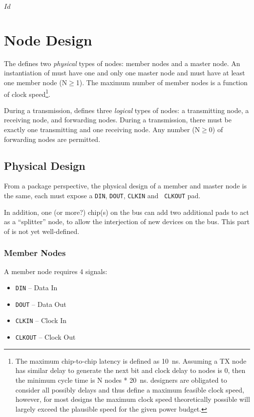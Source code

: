\svnInfo $Id$

\section{Node Design}
\label{sec:node}
The \bus defines two {\em physical} types of nodes: member nodes and a master
node. An instantiation of \bus must have one and only one master node and
must have at least one member node (N$\geq$1). The maximum number of member
nodes is a function of clock speed\footnote{
  The maximum chip-to-chip latency is defined as 10~ns. Assuming a TX node has
similar delay to generate the next bit and clock delay to nodes is 0, then the
minimum cycle time is N nodes * 20~ns. \bus designers are obligated to
consider all possibly delays and thus define a maximum feasible clock speed,
however, for most designs the maximum clock speed theoretically possible will
largely exceed the plausible speed for the given power budget.}.

During a transmission, \bus defines three {\em logical} types of nodes:
a transmitting node, a receiving node, and forwarding nodes. During a
transmission, there must be exactly one transmitting and one receiving node.
Any number (N$\geq$0) of forwarding nodes are permitted.

\subsection{Physical Design}
\label{sec:physical}

From a package perspective, the physical design of a member and master node
is the same, each must expose a {\tt DIN}, {\tt DOUT}, {\tt CLKIN} and {\tt
CLKOUT} pad.

In addition, one (or more?) chip(s) on the bus can add two additional pads to
act as a ``splitter'' node, to allow the interjection of new devices on the
bus. This part of \bus is not yet well-defined.

\subsubsection{Member Nodes}
\label{sec:physical-member}
A member node requires 4 signals:

\begin{itemize}
  \item {\tt DIN} -- Data In
  \item {\tt DOUT} -- Data Out
  \item {\tt CLKIN} -- Clock In
  \item {\tt CLKOUT} -- Clock Out
\end{itemize}

